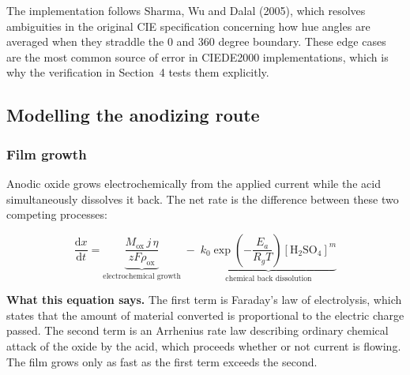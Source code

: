 \documentclass[11pt,a4paper]{article}
\begin{document}
The implementation follows Sharma, Wu and Dalal (2005), which resolves
ambiguities in the original CIE specification concerning how hue angles are
averaged when they straddle the 0 and 360 degree boundary. These edge cases are
the most common source of error in CIEDE2000 implementations, which is why the
verification in Section~4 tests them explicitly.

\subsection{Modelling the anodizing route}

\subsubsection{Film growth}

Anodic oxide grows electrochemically from the applied current while the acid
simultaneously dissolves it back. The net rate is the difference between these
two competing processes:

\begin{equation}
\frac{\mathrm{d}x}{\mathrm{d}t}
= \underbrace{\frac{M_\mathrm{ox}\, j\, \eta}{z F \rho_\mathrm{ox}}}_{\text{electrochemical growth}}
\;-\;
\underbrace{k_0 \exp\!\left(-\frac{E_a}{R_g T}\right)\left[\mathrm{H_2SO_4}\right]^m}_{\text{chemical back dissolution}}
\label{eq:anodize}
\end{equation}

\noindent\textbf{What this equation says.} The first term is Faraday's law of
electrolysis, which states that the amount of material converted is
proportional to the electric charge passed. The second term is an Arrhenius
rate law describing ordinary chemical attack of the oxide by the acid, which
proceeds whether or not current is flowing. The film grows only as fast as the
first term exceeds the second.
\end{document}
